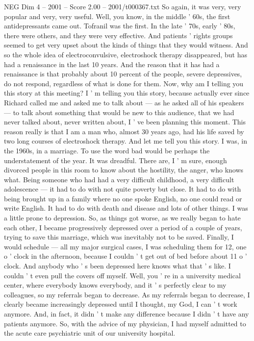 \begin{textsample}{NEG Dim 4 – 2001 – Score 2.00 – 2001/t000367.txt}
So again, it was very, very popular and very, very useful.
Well, you know, in the middle ' 60s, the first antidepressants came out.
Tofranil was the first.
In the late ' 70s, early ' 80s, there were others, and they were very effective.
And patients ' rights groups seemed to get very upset about the kinds of things that they would witness.
And so the whole idea of electroconvulsive, electroshock therapy disappeared, but has had a renaissance in the last 10 years.
And the reason that it has had a renaissance is that probably about 10 percent of the people, severe depressives, do not respond, regardless of what is done for them.
Now, why am I telling you this story at this meeting?
I ' m telling you this story, because actually ever since Richard called me and asked me to talk about — as he asked all of his speakers — to talk about something that would be new to this audience, that we had never talked about, never written about, I ' ve been planning this moment.
This reason really is that I am a man who, almost 30 years ago, had his life saved by two long courses of electroshock therapy.
And let me tell you this story.
I was, in the 1960s, in a marriage.
To use the word bad would be perhaps the understatement of the year.
It was dreadful.
There are, I ' m sure, enough divorced people in this room to know about the hostility, the anger, who knows what.
Being someone who had had a very difficult childhood, a very difficult adolescence — it had to do with not quite poverty but close.
It had to do with being brought up in a family where no one spoke English, no one could read or write English.
It had to do with death and disease and lots of other things.
I was a little prone to depression.
So, as things got worse, as we really began to hate each other, I became progressively depressed over a period of a couple of years, trying to save this marriage, which was inevitably not to be saved.
Finally, I would schedule — all my major surgical cases, I was scheduling them for 12, one o ' clock in the afternoon, because I couldn ' t get out of bed before about 11 o ' clock.
And anybody who ' s been depressed here knows what that ' s like.
I couldn ' t even pull the covers off myself.
Well, you ' re in a university medical center, where everybody knows everybody, and it ' s perfectly clear to my colleagues, so my referrals began to decrease.
As my referrals began to decrease, I clearly became increasingly depressed until I thought, my God, I can ' t work anymore.
And, in fact, it didn ' t make any difference because I didn ' t have any patients anymore.
So, with the advice of my physician, I had myself admitted to the acute care psychiatric unit of our university hospital.

\end{textsample}
